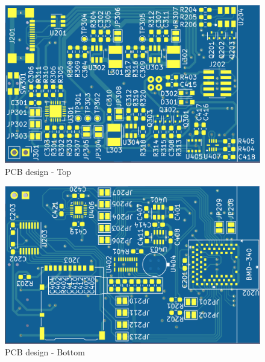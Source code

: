 \begin{figure}[!htb]
\centering
\includegraphics[width=0.9\paperwidth,keepaspectratio,angle=-90]{images/Board_Top.png}
\caption{PCB design - Top}
\label{fig:board_top}
\end{figure}

\begin{figure}[!htb]
\centering
\includegraphics[width=0.9\paperwidth,keepaspectratio,angle=-90]{images/Board_Bottom.png}
\caption{PCB design - Bottom}
\label{fig:board_bottom}
\end{figure}


